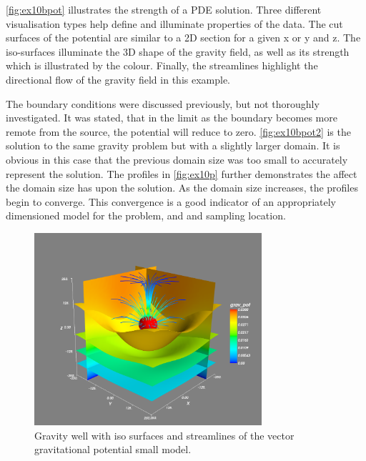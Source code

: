 \autoref{fig:ex10bpot} illustrates the strength of a PDE solution. Three
different visualisation types help define and illuminate properties of the data.
The cut surfaces of the potential are similar to a 2D section for a given x or y
and z. The iso-surfaces illuminate the 3D shape of the gravity field, as well as
its strength which is illustrated by the colour. Finally, the streamlines
highlight the directional flow of the gravity field in this example.

The boundary conditions were discussed previously, but not thoroughly
investigated. It was stated, that in the limit as the boundary becomes more
remote from the source, the potential will reduce to zero.
\autoref{fig:ex10bpot2} is the solution to the same gravity problem
but with a slightly larger domain. It is obvious in this case that
the previous domain size was too small to accurately represent the
solution. The profiles in \autoref{fig:ex10p} further demonstrates the affect
the domain size has upon the solution. As the domain size increases, the
profiles begin to converge. This convergence is a good indicator of an
appropriately dimensioned model for the problem, and and sampling location. 

\begin{figure}[htp]
\centering
\includegraphics[width=0.75\textwidth]{figures/ex10bpot.png}
\caption{Gravity well with iso surfaces and streamlines of the vector
gravitational potential \textemdash small model.}
\label{fig:ex10bpot}
\end{figure}

